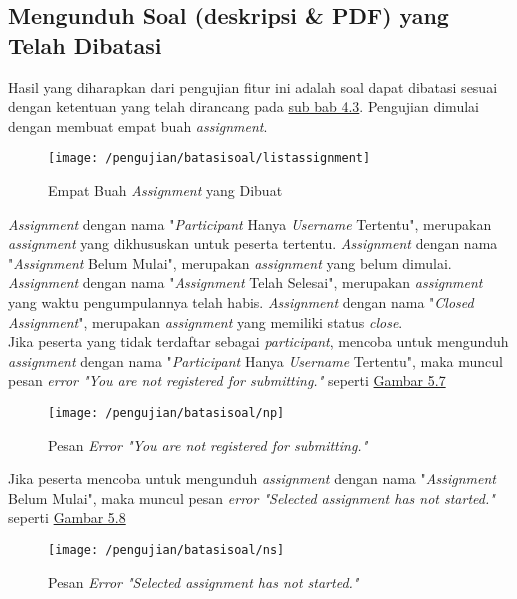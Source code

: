 	\subsection{Mengunduh Soal (deskripsi \& PDF) yang Telah Dibatasi} 
	Hasil yang diharapkan dari pengujian fitur ini adalah soal dapat dibatasi sesuai dengan ketentuan yang telah dirancang pada \hyperref[chap:batassoal]{sub bab 4.3}. Pengujian dimulai dengan membuat empat buah \textit{assignment}.
	\begin{figure}[H]
		\centering  
		\texttt{[image: /pengujian/batasisoal/listassignment]}  
		\caption[Empat Buah \textit{Assignment} yang Dibuat]{Empat Buah \textit{Assignment} yang Dibuat} 
		\label{fig:listassignment} 
	\end{figure}
	
	\textit{Assignment} dengan nama "\textit{Participant} Hanya \textit{Username} Tertentu", merupakan \textit{assignment} yang dikhususkan untuk peserta tertentu. \textit{Assignment} dengan nama "\textit{Assignment} Belum Mulai", merupakan \textit{assignment} yang belum dimulai. \textit{Assignment} dengan nama "\textit{Assignment} Telah Selesai", merupakan \textit{assignment} yang waktu pengumpulannya telah habis. \textit{Assignment} dengan nama "\textit{Closed Assignment}", merupakan \textit{assignment} yang memiliki status \textit{close}. \\
	
	Jika peserta yang tidak terdaftar sebagai \textit{participant}, mencoba untuk mengunduh \textit{assignment} dengan nama "\textit{Participant} Hanya \textit{Username} Tertentu", maka muncul pesan \textit{error "You are not registered for submitting."} seperti \hyperref[fig:np]{Gambar 5.7} 
	\begin{figure}[H]
		\centering  
		\texttt{[image: /pengujian/batasisoal/np]}  
		\caption[Pesan \textit{Error "You are not registered for submitting."}]{Pesan \textit{Error "You are not registered for submitting."}} 
		\label{fig:np} 
	\end{figure}

	Jika peserta mencoba untuk mengunduh \textit{assignment} dengan nama "\textit{Assignment} Belum Mulai", maka muncul pesan \textit{error "Selected assignment has not started."} seperti \hyperref[fig:ns]{Gambar 5.8} 
	\begin{figure}[H]
		\centering  
		\texttt{[image: /pengujian/batasisoal/ns]}  
		\caption[Pesan \textit{Error "Selected assignment has not started."}]{Pesan \textit{Error "Selected assignment has not started."}} 
		\label{fig:ns} 
	\end{figure}

